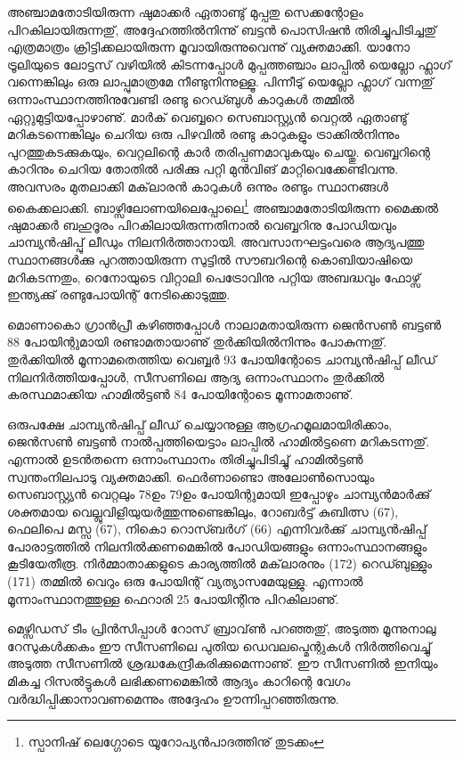 അഞ്ചാമതോടിയിരുന്ന ഷുമാക്കര്‍ ഏതാണ്ടു് മുപ്പതു സെക്കന്റോളം പിറകിലായിരുന്നതു്, അദ്ദേഹത്തില്‍നിന്നു് ബട്ടന്‍ 
പൊസിഷന്‍ തിരിച്ചുപിടിച്ചതു് എത്രമാത്രം ക്രിട്ടിക്കലായിരുന്ന മൂവായിരുന്നുവെന്നു് വ്യക്തമാക്കി. യാനോ ട്രൂലിയുടെ 
ലോട്ടസ് വഴിയില്‍ കിടന്നപ്പോള്‍ മുപ്പത്തഞ്ചാം ലാപ്പില്‍ യെല്ലോ ഫ്ലാഗ് വന്നെങ്കിലും ഒരു ലാപ്പുമാത്രമേ നീണ്ടുനിന്നുള്ളൂ. 
പിന്നീടു് യെല്ലോ ഫ്ലാഗ് വന്നതു് ഒന്നാംസ്ഥാനത്തിനുവേണ്ടി രണ്ടു റെഡ്ബുള്‍ കാറുകള്‍ തമ്മില്‍ ഏറ്റുമുട്ടിയപ്പോഴാണു്. 
മാര്‍ക് വെബ്ബറെ സെബാസ്റ്റ്യന്‍ വെറ്റല്‍ ഏതാണ്ടു് മറികടന്നെങ്കിലും ചെറിയ ഒരു പിഴവില്‍ രണ്ടു കാറുകളും ട്രാക്കില്‍നിന്നും 
പുറത്തുകടക്കുകയും, വെറ്റലിന്റെ കാര്‍ തരിപ്പണമാവുകയും ചെയ്തു. വെബ്ബറിന്റെ കാറിനും ചെറിയ തോതില്‍ പരിക്കു 
പറ്റി മുന്‍വിങ് മാറ്റിവെക്കേണ്ടിവന്നു. അവസരം മുതലാക്കി മക്‌ലാരന്‍ കാറുകള്‍ ഒന്നും രണ്ടും സ്ഥാനങ്ങള്‍ കൈക്കലാക്കി. 
ബാഴ്സിലോണയിലെപ്പോലെ\footnote{സ്പാനിഷ് ലെഗ്ഗോടെ യൂറോപ്യന്‍പാദത്തിനു് തുടക്കം} അഞ്ചാമതോടിയിരുന്ന മൈക്കല്‍ ഷുമാക്കര്‍ ബഹുദൂരം 
പിറകിലായിരുന്നതിനാല്‍ വെബ്ബറിനു പോഡിയവും ചാമ്പ്യന്‍ഷിപ്പു് ലീഡും 
നിലനിര്‍ത്താനായി. അവസാനഘട്ടംവരെ ആദ്യപത്തു സ്ഥാനങ്ങള്‍ക്കു പുറത്തായിരുന്ന 
സുട്ടില്‍ സൗബറിന്റെ കൊബിയാഷിയെ മറികടന്നതും, റെനോയുടെ വിറ്റാലി പെട്രോവിനു പറ്റിയ അബദ്ധവും ഫോഴ്സ് 
ഇന്ത്യക്കു് രണ്ടുപോയിന്റ് നേടിക്കൊടുത്തു.

മൊണാകൊ ഗ്രാന്‍പ്രീ കഴിഞ്ഞപ്പോള്‍ നാലാമതായിരുന്ന ജെന്‍സണ്‍ ബട്ടണ്‍ 88 പോയിന്റുമായി രണ്ടാമതായാണു് 
തുര്‍ക്കിയില്‍നിന്നും പോകുന്നതു്. തുര്‍ക്കിയില്‍ മൂന്നാമതെത്തിയ വെബ്ബര്‍ 93 പോയിന്റോടെ ചാമ്പ്യന്‍ഷിപ്പ് ലീഡ് 
നിലനിര്‍ത്തിയപ്പോള്‍, സീസണിലെ ആദ്യ ഒന്നാംസ്ഥാനം തുര്‍ക്കില്‍ കരസ്ഥമാക്കിയ ഹാമില്‍ട്ടണ്‍ 84 പോയിന്റോടെ 
മൂന്നാമതാണു്.

ഒരുപക്ഷേ ചാമ്പ്യന്‍ഷിപ്പ് ലീഡ് ചെയ്യാനുള്ള ആഗ്രഹമൂലമായിരിക്കാം, ജെന്‍സണ്‍ ബട്ടണ്‍ നാല്‍പ്പത്തിയെട്ടാം ലാപ്പില്‍ 
ഹാമില്‍ട്ടണെ മറികടന്നതു്. എന്നാല്‍ ഉടന്‍തന്നെ ഒന്നാംസ്ഥാനം തിരിച്ചുപിടിച്ചു് ഹാമില്‍ട്ടണ്‍ സ്വന്തംനിലപാടു വ്യക്തമാക്കി.
ഫെര്‍ണാണ്ടൊ അലോണ്‍സൊയും സെബാസ്റ്റ്യന്‍ വെറ്റലും 78ഉം 79ഉം പോയിന്റുമായി ഇപ്പോഴും ചാമ്പ്യന്‍മാര്‍ക്കു് 
ശക്തമായ വെല്ലുവിളിയുയര്‍ത്തുന്നുണ്ടെങ്കിലും, റോബര്‍ട്ട് കുബിത്സ (67), ഫെലിപെ മസ്സ (67), നികൊ റൊസ്ബര്‍ഗ് (66)
എന്നിവര്‍ക്കു് ചാമ്പ്യന്‍ഷിപ്പ് പോരാട്ടത്തില്‍ നിലനില്‍ക്കണമെങ്കില്‍ പോഡിയങ്ങളും ഒന്നാംസ്ഥാനങ്ങളും കൂടിയേതീരൂ. 
നിര്‍മ്മാതാക്കളുടെ കാര്യത്തില്‍ മക്‌ലാരനും (172) റെഡ്ബുള്ളും (171) തമ്മില്‍ വെറും ഒരു പോയിന്റ് വ്യത്യാസമേയുള്ളു.
എന്നാല്‍ മൂന്നാംസ്ഥാനത്തുള്ള ഫെറാരി 25 പോയിന്റിനു പിറകിലാണു്.

മെഴ്സിഡസ് ടീം പ്രിന്‍സിപ്പാള്‍ റോസ് ബ്രാവ്‌ണ്‍ പറഞ്ഞതു്, അടുത്ത മൂന്നുനാലു റേസുകള്‍ക്കകം ഈ സീസണിലെ പുതിയ
ഡെവലപ്മെന്റുകള്‍ നിര്‍ത്തിവെച്ചു് അടുത്ത സീസണില്‍ ശ്രദ്ധകേന്ദ്രീകരിക്കുമെന്നാണു്. ഈ സീസണില്‍ ഇനിയും മികച്ച 
റിസല്‍ട്ടുകള്‍ ലഭിക്കണമെങ്കില്‍ ആദ്യം കാറിന്റെ വേഗം വര്‍ദ്ധിപ്പിക്കാനാവണമെന്നും അദ്ദേഹം ഊന്നിപ്പറഞ്ഞിരുന്നു.

